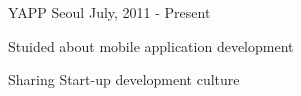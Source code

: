 \begin{cventries}
  \cventry
    {}
    {YAPP}
    {Seoul}
    {July, 2011 - Present}
    {
      \begin{cvitems}
        \item {Stuided about mobile application development}
        \item {Sharing Start-up development culture}
      \end{cvitems}
    }
\end{cventries}
